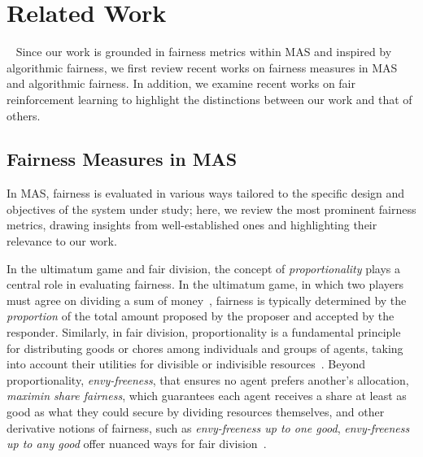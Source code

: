\section{Related Work}
~\label{RelatedWork}
Since our work is grounded in fairness metrics within MAS and inspired by algorithmic fairness, we first review recent works on fairness measures in MAS and algorithmic fairness. In addition, we examine recent works on fair reinforcement learning to highlight the distinctions between our work and that of others.

\subsection{Fairness Measures in MAS}
In MAS, fairness is evaluated in various ways tailored to the specific design and objectives of the system under study; here, we review the most prominent fairness metrics, drawing insights from well-established ones and highlighting their relevance to our work. 

In the ultimatum game and fair division, the concept of \textit{proportionality} plays a central role in evaluating fairness.
In the ultimatum game, in which two players must agree on dividing a sum of money~\cite{Guth2014,Debove2016}, fairness is typically determined by the \textit{proportion} of the total amount proposed by the proposer and accepted by the responder. Similarly, in fair division, proportionality is a fundamental principle for distributing goods or chores among individuals and groups of agents, taking into account their utilities for divisible or indivisible resources~\cite{Lindner2016,Amantidis2023,Murhekar2024}. Beyond proportionality, \textit{envy-freeness}, that ensures no agent prefers another's allocation, \textit{maximin share fairness}, which guarantees each agent receives a share at least as good as what they could secure by dividing resources themselves, and other derivative notions of fairness, such as \textit{envy-freeness up to one good}, \textit{envy-freeness up to any good} offer nuanced ways for fair division~\cite{Lipton2004,Budish2011,Caragiannis2019}. 

